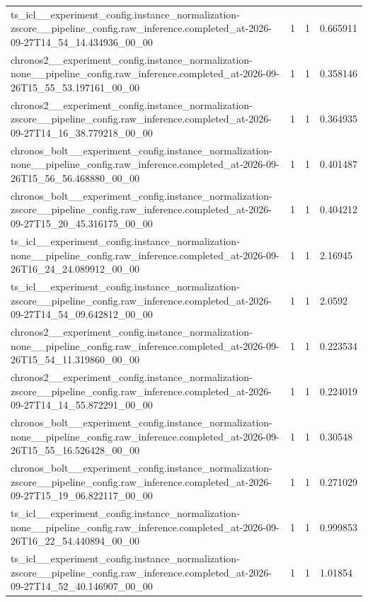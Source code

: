 \begin{tabular}{llll}
ts\_icl\_\_experiment\_config.instance\_normalization-zscore\_\_pipeline\_config.raw\_inference.completed\_at-2026-09-27T14\_54\_14.434936\_00\_00 & 1 & 1 & 0.665911 \\
chronos2\_\_experiment\_config.instance\_normalization-none\_\_pipeline\_config.raw\_inference.completed\_at-2026-09-26T15\_55\_53.197161\_00\_00 & 1 & 1 & 0.358146 \\
chronos2\_\_experiment\_config.instance\_normalization-zscore\_\_pipeline\_config.raw\_inference.completed\_at-2026-09-27T14\_16\_38.779218\_00\_00 & 1 & 1 & 0.364935 \\
chronos\_bolt\_\_experiment\_config.instance\_normalization-none\_\_pipeline\_config.raw\_inference.completed\_at-2026-09-26T15\_56\_56.468880\_00\_00 & 1 & 1 & 0.401487 \\
chronos\_bolt\_\_experiment\_config.instance\_normalization-zscore\_\_pipeline\_config.raw\_inference.completed\_at-2026-09-27T15\_20\_45.316175\_00\_00 & 1 & 1 & 0.404212 \\
ts\_icl\_\_experiment\_config.instance\_normalization-none\_\_pipeline\_config.raw\_inference.completed\_at-2026-09-26T16\_24\_24.089912\_00\_00 & 1 & 1 & 2.16945 \\
ts\_icl\_\_experiment\_config.instance\_normalization-zscore\_\_pipeline\_config.raw\_inference.completed\_at-2026-09-27T14\_54\_09.642812\_00\_00 & 1 & 1 & 2.0592 \\
chronos2\_\_experiment\_config.instance\_normalization-none\_\_pipeline\_config.raw\_inference.completed\_at-2026-09-26T15\_54\_11.319860\_00\_00 & 1 & 1 & 0.223534 \\
chronos2\_\_experiment\_config.instance\_normalization-zscore\_\_pipeline\_config.raw\_inference.completed\_at-2026-09-27T14\_14\_55.872291\_00\_00 & 1 & 1 & 0.224019 \\
chronos\_bolt\_\_experiment\_config.instance\_normalization-none\_\_pipeline\_config.raw\_inference.completed\_at-2026-09-26T15\_55\_16.526428\_00\_00 & 1 & 1 & 0.30548 \\
chronos\_bolt\_\_experiment\_config.instance\_normalization-zscore\_\_pipeline\_config.raw\_inference.completed\_at-2026-09-27T15\_19\_06.822117\_00\_00 & 1 & 1 & 0.271029 \\
ts\_icl\_\_experiment\_config.instance\_normalization-none\_\_pipeline\_config.raw\_inference.completed\_at-2026-09-26T16\_22\_54.440894\_00\_00 & 1 & 1 & 0.999853 \\
ts\_icl\_\_experiment\_config.instance\_normalization-zscore\_\_pipeline\_config.raw\_inference.completed\_at-2026-09-27T14\_52\_40.146907\_00\_00 & 1 & 1 & 1.01854 \\

\end{tabular}
